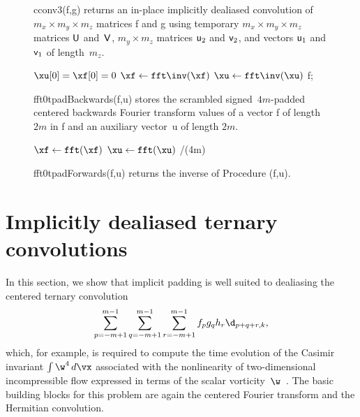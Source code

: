 \documentclass[final]{siamltex}
\begin{document}
\begin{figure}[htbp]
\begin{minipage}{0.55\linewidth}
\begin{function}[H]
  \Return \xf\;
\caption{cconv3({\sf f},{\sf g}) 
returns an in-place implicitly dealiased convolution of
\hbox{$m_x\times m_y\times m_z$} matrices {\sf f} and {\sf g} using temporary
\hbox{$m_x\times m_y\times m_z$} matrices ${\sf U}$ and~${\sf V}$, 
$m_y\times m_z$ matrices ${\sf u}_2$ and ${\sf v}_2$,
and vectors ${\sf u}_1$ and ${\sf v}_1$ of length~$m_z$.}\label{cconv3}
\end{function}
\end{minipage}
%
\begin{minipage}{0.46\linewidth}
\begin{procedure}[H]
  $\xu[0]=\xf[0]=0$\;
  $\xf \leftarrow \fft\inv(\xf)$\;
  $\xu \leftarrow \fft\inv(\xu)$\;
  \Return f;
  \caption{fft0tpadBackwards({\sf f},{\sf u}) stores the 
scrambled signed~$4m$-padded centered backwards Fourier transform values of a
vector {\sf f} of length~$2m$ in {\sf f} and an auxiliary vector~{\sf u} of
length $2m$.}\label{fft0tpadBackwards}
\end{procedure}
\begin{function}[H]
  $\xf \leftarrow \fft(\xf)$\;
  $\xu \leftarrow \fft(\xu)$\;
  \Return \xf/(4m)\;
  \caption{fft0tpadForwards({\sf f},{\sf u}) returns the
inverse of Procedure \fftOtpadBackwards({\sf f},{\sf u}).}
\label{fft0tpadForwards}
\end{function}
\end{minipage}
\end{figure}

\section{Implicitly dealiased ternary convolutions}\label{hyperconv}
In this section, we show that implicit padding is well suited to
dealiasing the centered ternary convolution
$$
\sum_{p=-m+1}^{m-1}\sum_{q=-m+1}^{m-1}\sum_{r=-m+1}^{m-1} f_p g_q h_r\d_{p+q+r,k},
$$
which, for example, is required to compute the time evolution of the
Casimir invariant $\int \w^4\,d\vx$ associated with the nonlinearity of
two-dimensional incompressible flow expressed in terms of the scalar
vorticity~$\w$~\cite{Bowman10}. The basic building blocks for this problem
are again the centered Fourier transform and the Hermitian convolution.
\end{document}
